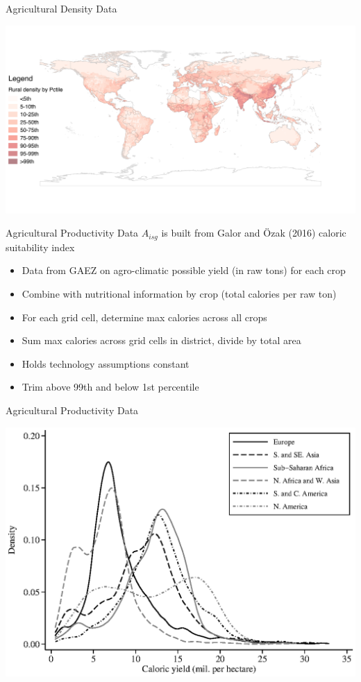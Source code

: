 \documentclass[10pt, xcolor=dvipsnames]{beamer}
\begin{document}
\begin{frame}{Agricultural Density Data}
\begin{center}
\includegraphics[scale=.5]{fig_rurd_map.png}
\end{center}
\end{frame}

\begin{frame}{Agricultural Productivity Data}\label{data}
$A_{isg}$ is built from Galor and {\"O}zak (2016) caloric suitability index
\begin{itemize}
  \item Data from GAEZ on agro-climatic possible yield (in raw tons) for each crop
  \item Combine with nutritional information by crop (total calories per raw ton)
  \item For each grid cell, determine max calories across all crops
  \item Sum max calories across grid cells in district, divide by total area
  \item Holds technology assumptions constant
  \item Trim above 99th and below 1st percentile
\end{itemize}
\hfill \hyperlink{stats}{}

\hfill \hyperlink{crops}{}
\end{frame}

\begin{frame}{Agricultural Productivity Data}
\begin{center}
\includegraphics[width=.8\textwidth]{fig_dens_csi.eps}
\end{center}
\end{frame}
\end{document}
